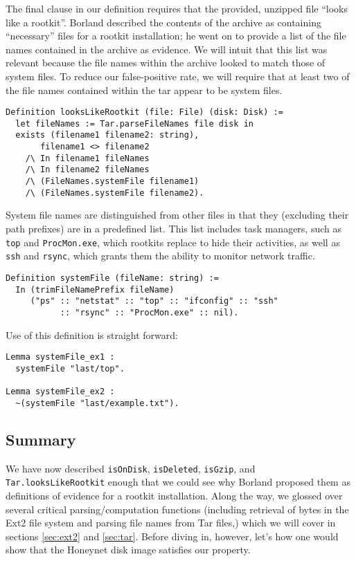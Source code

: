 \documentclass[nocopyrightspace]{sigplanconf}
\begin{document}
The final clause in our definition requires that the provided, unzipped file
``looks like a rootkit''. Borland described the contents of the archive as
containing ``necessary'' files for a rootkit installation; he went on to
provide a list of the file names contained in the archive as evidence. We will
intuit that this list was relevant because the file names within the archive
looked to match those of system files. To reduce our false-positive rate, we
will require that at least two of the file names contained within the tar
appear to be system files.

\begin{lstlisting}
Definition looksLikeRootkit (file: File) (disk: Disk) :=
  let fileNames := Tar.parseFileNames file disk in
  exists (filename1 filename2: string),
       filename1 <> filename2
    /\ In filename1 fileNames
    /\ In filename2 fileNames
    /\ (FileNames.systemFile filename1)
    /\ (FileNames.systemFile filename2).
\end{lstlisting}

System file names are distinguished from other files in that they (excluding
their path prefixes) are in a predefined list. This list includes task
managers, such as {\tt top} and {\tt ProcMon.exe}, which rootkits replace to
hide their activities, as well as {\tt ssh} and {\tt rsync}, which grants them
the ability to monitor network traffic.

\begin{lstlisting}
Definition systemFile (fileName: string) :=
  In (trimFileNamePrefix fileName)
     ("ps" :: "netstat" :: "top" :: "ifconfig" :: "ssh"
           :: "rsync" :: "ProcMon.exe" :: nil).
\end{lstlisting}

Use of this definition is straight forward:

\begin{lstlisting}
Lemma systemFile_ex1 : 
  systemFile "last/top".

Lemma systemFile_ex2 : 
  ~(systemFile "last/example.txt").
\end{lstlisting}

\subsection{Summary}

We have now described {\tt isOnDisk}, {\tt isDeleted}, {\tt isGzip}, and {\tt
Tar.looksLikeRootkit} enough that we could see why Borland proposed them as
definitions of evidence for a rootkit installation. Along the way, we glossed
over several critical parsing/computation functions (including retrieval of
bytes in the Ext2 file system and parsing file names from Tar files,) which we
will cover in sections \ref{sec:ext2} and \ref{sec:tar}. Before diving in,
however, let's how one would show that the Honeynet disk image satisfies our
property.
\end{document}
